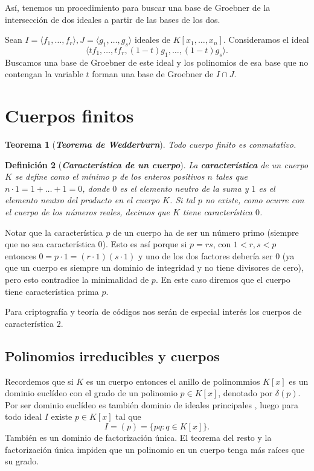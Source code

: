 \documentclass[12pt]{article}
\newtheorem{theorem}{Teorema}[section]
\newtheorem{definition}[theorem]{Definición}
\begin{document}
Así, tenemos un procedimiento para buscar una base de Groebner de la intersección de dos ideales a partir de las bases de los dos.

Sean $I = \langle f_1, \ldots, f_r \rangle, J = \langle g_1, \ldots, g_s \rangle$ ideales de $K[x_1, \ldots, x_n]$. Consideramos el ideal $$\langle tf_1, \ldots, tf_r, (1-t)g_1, \ldots, (1-t)g_s \rangle.$$ Buscamos una base de Groebner de este ideal y los polinomios de esa base que no contengan la variable $t$ forman una base de Groebner de $I \cap J$.

\section{Cuerpos finitos}

\begin{theorem}[\textbf{\textit{Teorema de Wedderburn}}]
Todo cuerpo finito es conmutativo.
\end{theorem}

\begin{definition}[\textbf{\textit{Característica de un cuerpo}}] La \textbf{característica} de un cuerpo $K$ se define como el mínimo $p$ de los enteros positivos $n$ tales que $n\cdot 1 = 1 + \ldots + 1 = 0$, donde $0$ es el elemento neutro de la suma y $1$ es el elemento neutro del producto en el cuerpo $K$. Si tal $p$ no existe, como ocurre con el cuerpo de los números reales, decimos que $K$ tiene característica $0$.
\end{definition}

Notar que la característica $p$ de un cuerpo ha de ser un número primo (siempre que no sea característica $0$). Esto es así porque si $p =rs$, con $1 < r,s < p$ entonces $0=p\cdot 1 = (r\cdot 1 )(s \cdot 1)$ y uno de los dos factores debería ser $0$ (ya que un cuerpo es siempre un dominio de integridad y no tiene divisores de cero), pero esto contradice la minimalidad de $p$. En este caso diremos que el cuerpo tiene característica prima $p$.

Para criptografía y teoría de códigos nos serán de especial interés los cuerpos de característica $2$.

\subsection{Polinomios irreducibles y cuerpos}
Recordemos que si $K$ es un cuerpo entonces el anillo de polinommios $K[x]$ es un dominio euclídeo con el grado de un polinomio $p \in K[x]$, denotado por $\delta (p)$. Por ser dominio euclídeo es también dominio de ideales principales , luego para todo ideal $I$ existe $p \in K[x]$ tal que $$I = (p) = \lbrace pq: q \in K[x] \rbrace.$$ También es un dominio de factorización única. El teorema del resto y la factorización única impiden que un polinomio en un cuerpo tenga más raíces que su grado.
\end{document}
